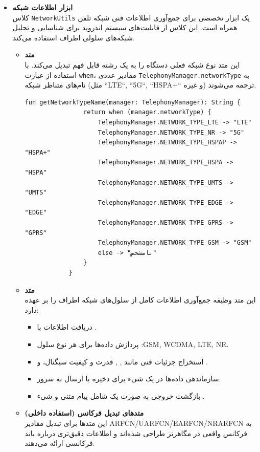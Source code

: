 \documentclass{report}
\begin{document}
\begin{itemize}
	\item \textbf{ابزار اطلاعات شبکه}\\
	کلاس \texttt{NetworkUtils} یک ابزار تخصصی برای جمع‌آوری اطلاعات فنی شبکه تلفن همراه است. این کلاس از قابلیت‌های سیستم اندروید برای شناسایی و تحلیل شبکه‌های سلولی اطراف استفاده می‌کند.
	
	\begin{itemize}
		\item \textbf{متد }\\
		این متد نوع شبکه فعلی دستگاه را به یک رشته قابل فهم تبدیل می‌کند. با استفاده از عبارت \texttt{when}، مقادیر عددی \texttt{TelephonyManager.networkType} به نام‌های متناظر شبکه (مثل ``LTE``, ``5G``, ``HSPA+`` و غیره) ترجمه می‌شوند.
		
		\begin{lstlisting}[caption=متد getNetworkTypeName]
			fun getNetworkTypeName(manager: TelephonyManager): String {
				return when (manager.networkType) {
					TelephonyManager.NETWORK_TYPE_LTE -> "LTE"
					TelephonyManager.NETWORK_TYPE_NR -> "5G"
					TelephonyManager.NETWORK_TYPE_HSPAP -> "HSPA+"
					TelephonyManager.NETWORK_TYPE_HSPA -> "HSPA"
					TelephonyManager.NETWORK_TYPE_UMTS -> "UMTS"
					TelephonyManager.NETWORK_TYPE_EDGE -> "EDGE"
					TelephonyManager.NETWORK_TYPE_GPRS -> "GPRS"
					TelephonyManager.NETWORK_TYPE_GSM -> "GSM"
					else -> "نامشخص"
				}
			}
		\end{lstlisting}
		
		\item \textbf{متد }\\
		این متد وظیفه جمع‌آوری اطلاعات کامل از سلول‌های شبکه اطراف را بر عهده دارد:
		
		\begin{itemize}
			\item دریافت اطلاعات با .
			\item پردازش داده‌ها برای هر نوع سلول :GSM, WCDMA, LTE, NR.
			\item استخراج جزئیات فنی مانند , , قدرت و کیفیت سیگنال،  و .
			\item سازماندهی داده‌ها در یک شیء  برای ذخیره یا ارسال به سرور.
			\item بازگشت خروجی به صورت یک  شامل پیام متنی و شیء .
		\end{itemize}
		
		\item \textbf{متدهای تبدیل فرکانس (استفاده داخلی)}\\
		این متدها برای تبدیل مقادیر ARFCN/UARFCN/EARFCN/NRARFCN به فرکانس واقعی در مگاهرتز طراحی شده‌اند و اطلاعات دقیق‌تری درباره باند فرکانسی ارائه می‌دهند.
		

\end{itemize}
\end{itemize}
\end{document}
